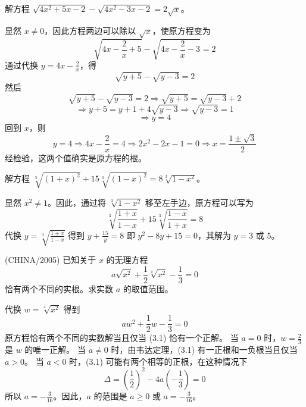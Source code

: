 \begin{questions}
\question
解方程 $\sqrt{4x^2+5x-2}-\sqrt{4x^2-3x-2}=2\sqrt{x}$。
\begin{solution}
显然 $x \ne 0$，因此方程两边可以除以 $\sqrt{x}$，使原方程变为
\[
\sqrt{4x-\frac{2}{x}+5}-\sqrt{4x-\frac{2}{x}-3}=2
\]
通过代换 $y=4x-\frac{2}{x}$，得
\[
\sqrt{y+5}-\sqrt{y-3}=2
\]
然后
\[
\sqrt{y+5}-\sqrt{y-3}=2 \Rightarrow \sqrt{y+5}=\sqrt{y-3}+2
\]
\[
\Rightarrow y+5=y+1+4\sqrt{y-3} \Rightarrow \sqrt{y-3}=1
\]
\[
\Rightarrow y=4
\]
回到 $x$，则
\[
y=4 \Rightarrow 4x-\frac{2}{x}=4 \Rightarrow 2x^2-2x-1=0 \Rightarrow x=\frac{1\pm\sqrt{3}}{2}
\]
经检验，这两个值确实是原方程的根。
\end{solution}

\question
解方程 $\sqrt[3]{(1+x)^2}+15\sqrt[3]{(1-x)^2}=8\sqrt[3]{1-x^2}$。
\begin{solution}
显然 $x^2 \ne 1$。因此，通过将 $\sqrt[3]{1-x^2}$ 移至左手边，原方程可以写为
\[
\sqrt[3]{\frac{1+x}{1-x}}+15\sqrt[3]{\frac{1-x}{1+x}}=8
\]
代换 $y=\sqrt[3]{\frac{1+x}{1-x}}$ 得到 $y+\frac{15}{y}=8$ 即 $y^2-8y+15=0$，其解为 $y=3$ 或 $5$。
\end{solution}

\question
(CHINA/2005) 已知关于 $x$ 的无理方程
\[
a\sqrt{x^2}+\frac{1}{2}\sqrt[4]{x^2}-\frac{1}{3}=0
\]
恰有两个不同的实根。求实数 $a$ 的取值范围。
\begin{solution}
代换 $w=\sqrt[4]{x^2}$ 得到
\[
aw^2+\frac{1}{2}w-\frac{1}{3}=0
\]
原方程恰有两个不同的实数解当且仅当 (3.1) 恰有一个正解。
当 $a=0$ 时，$w=\frac{2}{3}$ 是 $w$ 的唯一正解。
当 $a \ne 0$ 时，由韦达定理，(3.1) 有一正根和一负根当且仅当 $a > 0$。
当 $a < 0$ 时，(3.1) 可能有两个相等的正根，在这种情况下
\[
\Delta=\left(\frac{1}{2}\right)^2-4a\left(-\frac{1}{3}\right)=0
\]
所以 $a=-\frac{3}{16}$。因此，$a$ 的范围是 $a \ge 0$ 或 $a=-\frac{3}{16}$。
\end{solution}


\end{questions}
